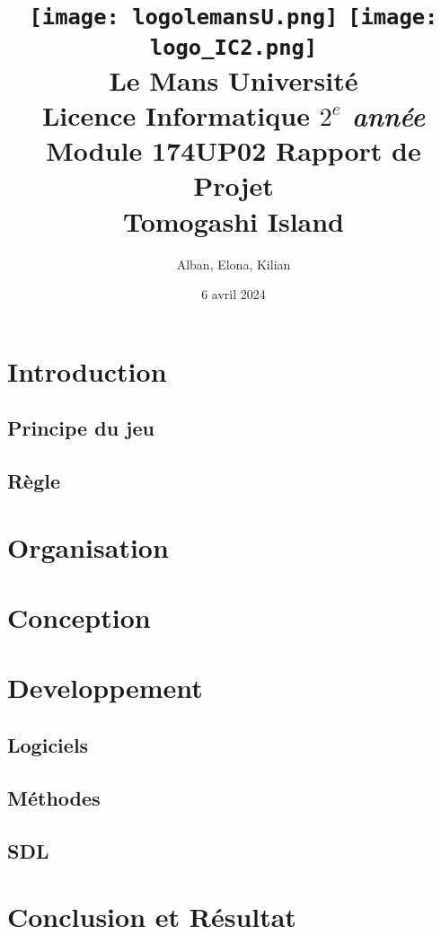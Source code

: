 \documentclass{article}
\begin{document}
\begin{titlepage}
    \title{
        \texttt{[image: logolemansU.png]}
        \hspace{150pt}
        \texttt{[image: logo\_IC2.png]}
        \\[2cm]
        \color{blue} \textbf{Le Mans Université} \\
        \color{black} Licence Informatique \textit{$2^{e}$ année} \\
        Module 174UP02 Rapport de Projet \\
        \textbf{Tomogashi Island}
    }
    \author{Alban, Elona, Kilian }
    \date{6 avril 2024}
    \maketitle
\end{titlepage}

\newpage
\tableofcontents

\newpage

\section{Introduction}
    \subsection{Principe du jeu}
    \subsection{Règle}
\section{Organisation}
\section{Conception}
\section{Developpement}
    \subsection{Logiciels}
    \subsection{Méthodes}
    \subsection{SDL}
\section{Conclusion et Résultat}
\end{document}
